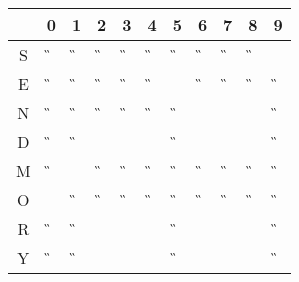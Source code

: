 \begin{tabular}{|c|c|c|c|c|c|c|c|c|c|c|}\hline
  & 0 & 1 & 2 & 3 & 4 & 5 & 6 & 7 & 8 & 9 \\ \hline
S &\G &\G &\G &\G &\G &\G &\G &\G &\G &\A \\ \hline
E &\G &\G &\G &\G &\G &\A &\G &\G &\G &\G \\ \hline
N &\G &\G &\G &\G &\G &\G &   &   &   &\G \\ \hline
D &\G &\G &   &   &   &\G &   &   &   &\G \\ \hline
M &\G &\A &\G &\G &\G &\G &\G &\G &\G &\G \\ \hline
O &\A &\G &\G &\G &\G &\G &\G &\G &\G &\G \\ \hline
R &\G &\G &   &   &   &\G &   &   &   &\G \\ \hline
Y & \G&\G &   &   &   &\G &   &   &   &\G \\ \hline
\end{tabular}
